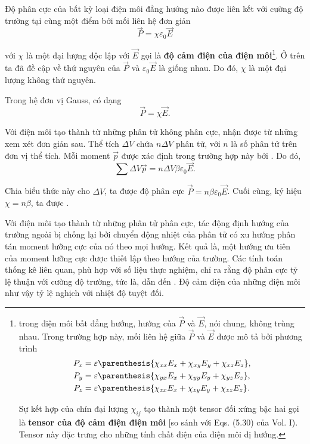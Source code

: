 Độ phân cực của bất kỳ loại điện môi đẳng hướng nào được liên kết với cường độ trường tại cùng một điểm bởi mối liên hệ đơn giản
\begin{equation}\label{eq:2_5}
    \vec{P} = \chi \varepsilon_0 \vec{E}
\end{equation}

\noindent
với $\chi$ là một đại lượng độc lập với $\vec{E}$ gọi là \textbf{độ cảm điện của điện môi}\footnote{trong điện môi bất đẳng hướng, hướng của $\vec{P}$ và $\vec{E}$, nói chung, không trùng nhau. Trong trường hợp này, mối liên hệ giữa $\vec{P}$ và $\vec{E}$ được mô tả bởi phương trình
\begin{align*}
    P_x &= \varepsilon\parenthesis{\chi_{xx}E_x + \chi_{xy}E_y+\chi_{xz}E_z},\\
    P_y &= \varepsilon\parenthesis{\chi_{yx}E_x + \chi_{yy}E_y+\chi_{yz}E_z},\\
    P_z &= \varepsilon\parenthesis{\chi_{zx}E_x + \chi_{zy}E_y+\chi_{zz}E_z}.
\end{align*}

\noindent
Sự kết hợp của chín đại lượng $\chi_{ij}$ tạo thành một tensor đối xứng bậc hai gọi là \textbf{tensor của độ cảm điện điện môi} [so sánh với Eqs. (5.30)
của Vol. I). Tensor này đặc trưng cho những tính chất điện của điện môi dị hướng.}. Ở trên ta đã đề cập về thứ nguyên của $\vec{P}$ và $\varepsilon_0\vec{E}$ là giống nhau. Do đó, $\chi$ là một đại lượng không thứ nguyên.

Trong hệ đơn vị Gauss,  có dạng
\begin{equation}\label{eq:2_6}
    \vec{P} = \chi \vec{E}.
\end{equation}

Với điện môi tạo thành từ những phân tử không phân cực,  nhận được từ những xem xét đơn giản sau. Thể tích $\Delta{V}$ chứa $n\Delta{V}$ phân tử, với $n$ là số phân tử trên đơn vị thể tích. Mỗi moment $\vec{p}$ được xác định trong trường hợp này bởi . Do đó,
\begin{equation*}
    \sum{\Delta{V}} \vec{p} = n \Delta{V} \beta \varepsilon_0 \vec{E}.
\end{equation*}

\noindent
Chia biểu thức này cho $\Delta{V}$, ta được độ phân cực $\vec{P}=n\beta\varepsilon_0\vec{E}$. Cuối cùng, ký hiệu $\chi=n\beta$, ta được .

Với điện môi tạo thành từ những phân tử phân cực, tác động định hướng của trường ngoài bị chống lại bởi chuyển động nhiệt của phân tử có xu hướng phân tán moment lưỡng cực của nó theo mọi hướng. Kết quả là, một hướng ưu tiên của moment lưỡng cực được thiết lập theo hướng của trường. Các tính toán thống kê liên quan, phù hợp với số liệu thực nghiệm, chỉ ra rằng độ phân cực tỷ lệ thuận với cường độ trường, tức là, dẫn đến . Độ cảm điện của những điện môi như vậy tỷ lệ nghịch với nhiệt độ tuyệt đối.

